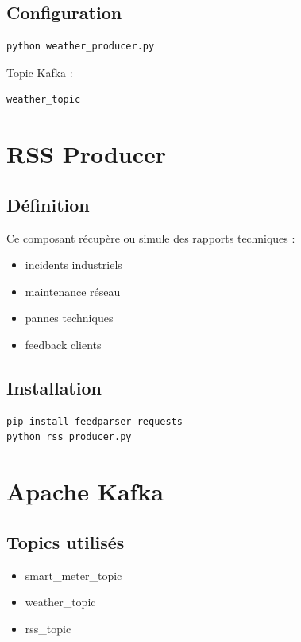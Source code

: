 \documentclass[12pt,a4paper]{report}
\begin{document}
\subsection{Configuration}

\begin{verbatim}
python weather_producer.py
\end{verbatim}

Topic Kafka :

\begin{verbatim}
weather_topic
\end{verbatim}

\section{RSS Producer}

\subsection{Définition}

Ce composant récupère ou simule des rapports techniques :

\begin{itemize}
    \item incidents industriels
    \item maintenance réseau
    \item pannes techniques
    \item feedback clients
\end{itemize}

\subsection{Installation}

\begin{verbatim}
pip install feedparser requests
python rss_producer.py
\end{verbatim}

\section{Apache Kafka}

\subsection{Topics utilisés}

\begin{itemize}
    \item smart\_meter\_topic
    \item weather\_topic
    \item rss\_topic
\end{itemize}
\end{document}
